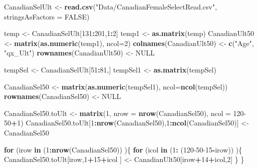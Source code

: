 \documentclass[
]{book}
\newenvironment{Shaded}{\begin{snugshade}}{\end{snugshade}}
\newcommand{\ControlFlowTok}[1]{\textcolor[rgb]{0.13,0.29,0.53}{\textbf{#1}}}
\newcommand{\DataTypeTok}[1]{\textcolor[rgb]{0.13,0.29,0.53}{#1}}
\newcommand{\DecValTok}[1]{\textcolor[rgb]{0.00,0.00,0.81}{#1}}
\newcommand{\KeywordTok}[1]{\textcolor[rgb]{0.13,0.29,0.53}{\textbf{#1}}}
\newcommand{\NormalTok}[1]{#1}
\newcommand{\OperatorTok}[1]{\textcolor[rgb]{0.81,0.36,0.00}{\textbf{#1}}}
\newcommand{\OtherTok}[1]{\textcolor[rgb]{0.56,0.35,0.01}{#1}}
\newcommand{\StringTok}[1]{\textcolor[rgb]{0.31,0.60,0.02}{#1}}
\begin{document}
\hypertarget{toggleCode.Exer4.3.1A}{}
\begin{Shaded}
\begin{Highlighting}[]
\NormalTok{CanadianSelUlt <-}\StringTok{ }\KeywordTok{read.csv}\NormalTok{(}\StringTok{"Data/CanadianFemaleSelectRead.csv"}\NormalTok{, }\DataTypeTok{stringsAsFactors =} \OtherTok{FALSE}\NormalTok{)}

\NormalTok{temp <-}\StringTok{ }\NormalTok{CanadianSelUlt[}\DecValTok{131}\OperatorTok{:}\DecValTok{201}\NormalTok{,}\DecValTok{1}\OperatorTok{:}\DecValTok{2}\NormalTok{]}
\NormalTok{temp1 <-}\StringTok{ }\KeywordTok{as.matrix}\NormalTok{(temp)}
\NormalTok{CanadianUlt50 <-}\StringTok{ }\KeywordTok{matrix}\NormalTok{(}\KeywordTok{as.numeric}\NormalTok{(temp1), }\DataTypeTok{ncol=}\DecValTok{2}\NormalTok{)}
\KeywordTok{colnames}\NormalTok{(CanadianUlt50) <-}\StringTok{ }\KeywordTok{c}\NormalTok{(}\StringTok{"Age"}\NormalTok{, }\StringTok{"qx_Ult"}\NormalTok{)}
\KeywordTok{rownames}\NormalTok{(CanadianUlt50) <-}\StringTok{ }\OtherTok{NULL}

\NormalTok{tempSel <-}\StringTok{ }\NormalTok{CanadianSelUlt[}\DecValTok{51}\OperatorTok{:}\DecValTok{81}\NormalTok{,]}
\NormalTok{tempSel1 <-}\StringTok{ }\KeywordTok{as.matrix}\NormalTok{(tempSel)}

\NormalTok{CanadianSel50 <-}\StringTok{ }\KeywordTok{matrix}\NormalTok{(}\KeywordTok{as.numeric}\NormalTok{(tempSel1), }\DataTypeTok{ncol=}\KeywordTok{ncol}\NormalTok{(tempSel))}
\KeywordTok{rownames}\NormalTok{(CanadianSel50) <-}\StringTok{ }\OtherTok{NULL}

\NormalTok{CanadianSel50.toUlt <-}\StringTok{ }\KeywordTok{matrix}\NormalTok{(}\DecValTok{1}\NormalTok{, }\DataTypeTok{nrow =} \KeywordTok{nrow}\NormalTok{(CanadianSel50), }\DataTypeTok{ncol =} \DecValTok{120-50}\OperatorTok{+}\DecValTok{1}\NormalTok{)}
\NormalTok{CanadianSel50.toUlt[}\DecValTok{1}\OperatorTok{:}\KeywordTok{nrow}\NormalTok{(CanadianSel50),}\DecValTok{1}\OperatorTok{:}\KeywordTok{ncol}\NormalTok{(CanadianSel50)] <-}\StringTok{ }\NormalTok{CanadianSel50}

\ControlFlowTok{for}\NormalTok{ (irow }\ControlFlowTok{in}\NormalTok{ (}\DecValTok{1}\OperatorTok{:}\KeywordTok{nrow}\NormalTok{(CanadianSel50)) )\{}
\ControlFlowTok{for}\NormalTok{ (icol }\ControlFlowTok{in}\NormalTok{ (}\DecValTok{1}\OperatorTok{:}\StringTok{ }\NormalTok{(}\DecValTok{120-50-15}\OperatorTok{-}\NormalTok{irow)) )\{}
\NormalTok{  CanadianSel50.toUlt[irow,}\DecValTok{1}\OperatorTok{+}\DecValTok{15}\OperatorTok{+}\NormalTok{icol ] <-}\StringTok{ }\NormalTok{CanadianUlt50[irow}\OperatorTok{+}\DecValTok{14}\OperatorTok{+}\NormalTok{icol,}\DecValTok{2}\NormalTok{]}
\NormalTok{   \}}
\NormalTok{\}}


\end{Highlighting}
\end{Shaded}
\end{document}
